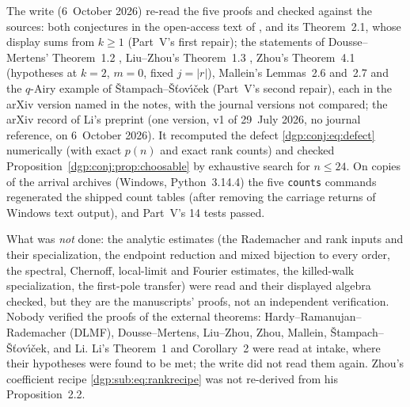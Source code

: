 \documentclass[11pt,letterpaper]{article}
\numberwithin{equation}{section}
\theoremstyle{remark}\newtheorem{remark}[theorem]{Remark}
\begin{document}
The write (6~October 2026) re-read the five proofs and checked against the sources: both conjectures in the open-access text of \cite{abek}, and its Theorem~2.1, whose display sums from $k\ge1$ (Part~V's first repair); the statements of Dousse--Mertens' Theorem~1.2 \cite{dm}, Liu--Zhou's Theorem~1.3 \cite{lz}, Zhou's Theorem~4.1 \cite{zhou} (hypotheses at $k=2$, $m=0$, fixed $j=|r|$), Mallein's Lemmas~2.6 and~2.7 \cite{mallein} and the $q$-Airy example of \v{S}tampach--\v{S}\v{t}ov\'{\i}\v{c}ek \cite{ss} (Part~V's second repair), each in the arXiv version named in the notes, with the journal versions not compared; the arXiv record of Li's preprint (one version, v1 of 29~July 2026, no journal reference, on 6~October 2026). It recomputed the defect \eqref{dgp:conj:eq:defect} numerically (with exact $p(n)$ and exact rank counts) and checked Proposition~\ref{dgp:conj:prop:choosable} by exhaustive search for $n\le24$. On copies of the arrival archives (Windows, Python~3.14.4) the five \texttt{counts} commands regenerated the shipped count tables (after removing the carriage returns of Windows text output), and Part~V's 14 tests passed.

What was \emph{not} done: the analytic estimates (the Rademacher and rank inputs and their specialization, the endpoint reduction and mixed bijection to every order, the spectral, Chernoff, local-limit and Fourier estimates, the killed-walk specialization, the first-pole transfer) were read and their displayed algebra checked, but they are the manuscripts' proofs, not an independent verification. Nobody verified the proofs of the external theorems: Hardy--Ramanujan--Rademacher (DLMF), Dousse--Mertens, Liu--Zhou, Zhou, Mallein, \v{S}tampach--\v{S}\v{t}ov\'{\i}\v{c}ek, and Li. Li's Theorem~1 and Corollary~2 were read at intake, where their hypotheses were found to be met; the write did not read them again. Zhou's coefficient recipe \eqref{dgp:sub:eq:rankrecipe} was not re-derived from his Proposition~2.2.
\end{document}
